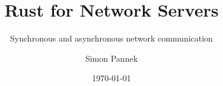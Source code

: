 \title[Rust for Network Servers]{Rust for Network Servers}
\subtitle{Synchronous and asynchronous network communication}

\author[Simon Pannek] {Simon Pannek}
\date{\today}
